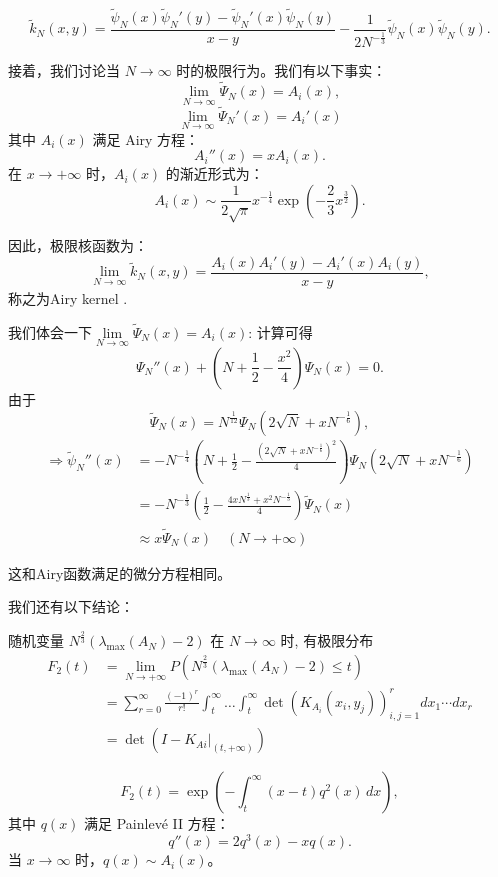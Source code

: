 \[
\tilde{k}_{N}(x, y) = \frac{\tilde{\psi}_{N}(x) \tilde{\psi}_{N}'(y) - \tilde{\psi}_{N}'(x) \tilde{\psi}_{N}(y)}{x - y} - \frac{1}{2 N^{-\frac{1}{3}}} \tilde{\psi}_{N}(x) \tilde{\psi}_{N}(y).
\]

接着，我们讨论当 \( N \to \infty \) 时的极限行为。我们有以下事实：
\[
\lim_{N \to \infty} \tilde{\Psi}_N(x) = A_i(x),
\]
\[\lim_{N \to \infty} \tilde{\Psi}_N'(x) = A_i'(x)\]
其中 \( A_i(x) \) 满足 Airy 方程：
\[
A_i''(x) = x A_i(x).
\]
在 \( x \to +\infty \) 时，\( A_i(x) \) 的渐近形式为：
\[
A_i(x) \sim \frac{1}{2\sqrt{\pi}} x^{-\frac{1}{4}} \exp \left( -\frac{2}{3} x^{\frac{3}{2}} \right).
\]

因此，极限核函数为：
\[
\lim_{N \to \infty} \tilde{k}_N(x, y) = \frac{A_i(x) A_i'(y) - A_i'(x) A_i(y)}{x - y},
\]
 称之为Airy kernel .

 我们体会一下$\lim\limits_{N \to \infty} \tilde{\Psi}_N(x) = A_i(x)$:
计算可得 \[\Psi_{N}''(x)+(N+\frac{1}{2}-\frac{x^{2}}{4})\Psi_{N}(x)=0.\]
由于\[\tilde{\Psi}_{N}(x)=N^{\frac{1}{12}}\Psi_{N}(2\sqrt{N}+xN^{-\frac{1}{6}}),\]
\begin{equation*}
    \begin{aligned}
        \Rightarrow\tilde{\psi}_{N}''(x)&=-N^{-\frac{1}{4}}\left(N+\frac{1}{2}-\frac{(2\sqrt{N}+xN^{-\frac{1}{6}})^{2}}{4}\right)\Psi_{N}(2\sqrt{N}+xN^{-\frac{1}{6}}) \\
        &=-N^{-\frac{1}{3}}\left(\frac{1}{2}-\frac{4xN^{\frac{1}{3}}+x^{2}N^{-\frac{1}{3}}}{4}\right)\tilde{\Psi}_{N}(x) \\
        &\approx x\tilde{\Psi}_{N}(x)\quad(N\rightarrow+\infty)
    \end{aligned}
\end{equation*}

这和Airy函数满足的微分方程相同。

我们还有以下结论：
\begin{theorem}
    随机变量 $N^{\frac{2}{3}}(\lambda_{\max}(A_{N})-2)$ 在 $N\rightarrow \infty$ 时, 有极限分布
\begin{equation*}
    \begin{aligned}
        F_{2}(t)&=\lim_{N\rightarrow+\infty} P(N^{\frac{2}{3}}(\lambda_{\max}(A_N)-2)\le t)\\
        &=\sum_{r=0}^{\infty}\frac{(-1)^{r}}{r!}\int_{t}^{\infty}\dots\int_{t}^{\infty}\det(K_{A_{i}}(x_{i},y_{j}))_{i,j=1}^{r}dx_{1} \cdots dx_{r} \\
        &=\det(I-K_{Ai}|_{(t,+\infty)})
    \end{aligned}
\end{equation*}
\end{theorem}

\begin{theorem}
    \[
F_2(t) = \exp \left( -\int_{t}^{\infty} (x - t) q^2(x) \, dx \right),
\]
其中 \( q(x) \) 满足 Painlevé II 方程：
\[
q''(x) = 2q^3(x) - x q(x).
\]
当 \( x \to \infty \) 时，\( q(x) \sim A_i(x) \)。

\end{theorem}